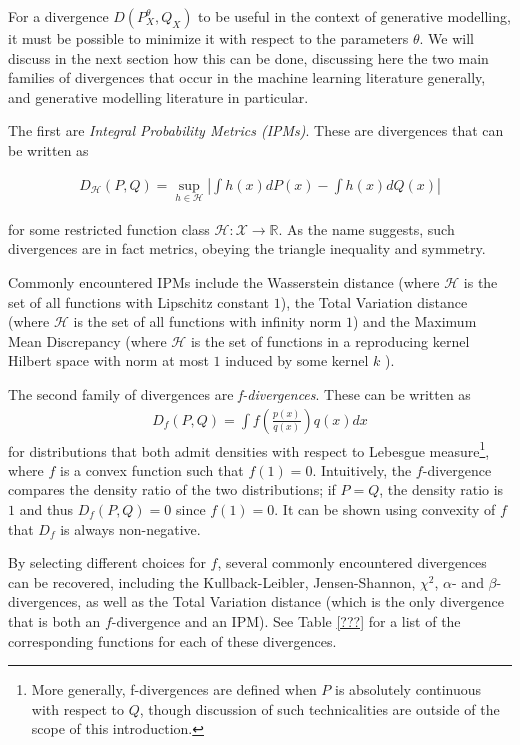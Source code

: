 For a divergence $D(P^\theta_X, Q_X)$ to be useful in the context of generative modelling, it must be possible to minimize it with respect to the parameters $\theta$. 
We will discuss in the next section how this can be done, discussing here the two main families 
of divergences that occur in the machine learning literature generally, and generative modelling literature in particular. 

The first are \emph{Integral Probability Metrics (IPMs)}. 
These are divergences that can be written as

\begin{align*}
D_{\mathcal{H}}(P, Q) = \sup_{h\in\mathcal{H}} \left| \int h(x) dP(x) - \int h(x) dQ(x) \right|
\end{align*}

for some restricted function class $\mathcal{H}: \mathcal{X} \to \mathbb{R}$. 
As the name suggests, such divergences are in fact metrics, obeying the triangle inequality and symmetry.

Commonly encountered IPMs include the Wasserstein distance (where $\mathcal{H}$ is the set of all functions with Lipschitz constant $1$), the Total Variation distance (where $\mathcal{H}$ is the set of all functions with infinity norm $1$) and the Maximum Mean Discrepancy (where $\mathcal{H}$ is the set of functions in a reproducing kernel Hilbert space with norm at most $1$ induced by some kernel $k$ \cite{gretton}).

The second family of divergences are \emph{f-divergences}. 
These can be written as
\begin{align*}
D_f(P, Q) = \int f\left(\frac{p(x)}{q(x)}\right) q(x) dx
\end{align*}
for distributions that both admit densities with respect to Lebesgue measure\footnote{More generally, f-divergences are defined when $P$ is absolutely continuous with respect to $Q$, though discussion of such technicalities are outside of the scope of this introduction.}, where $f$ is a convex function such that $f(1)=0$. 
Intuitively, the $f$-divergence compares the density ratio of the two distributions; if $P=Q$, the density ratio is $1$ and thus $D_f(P,Q) = 0$ since $f(1)=0$. 
It can be shown using convexity of $f$ that $D_f$ is always non-negative.

By selecting different choices for $f$, several commonly encountered divergences can be recovered, including the Kullback-Leibler, Jensen-Shannon, $\chi^2$, $\alpha$- and $\beta$-divergences, as well as the Total Variation distance (which is the only divergence that is both an $f$-divergence and an IPM).
See Table \ref{???} for a list of the corresponding functions for each of these divergences.



